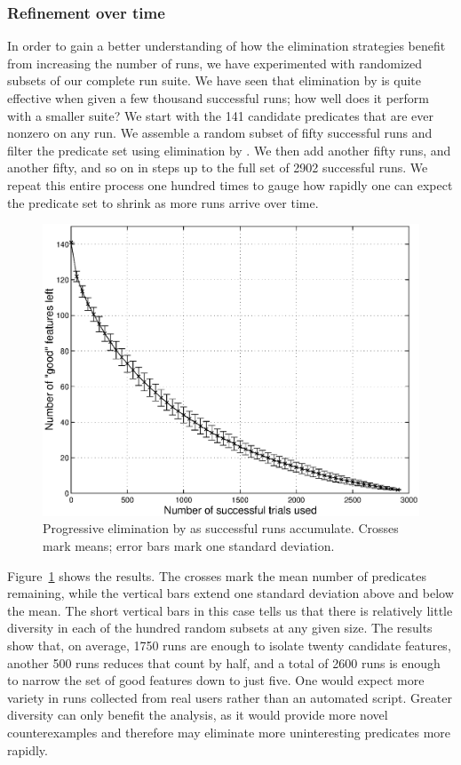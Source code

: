 \subsubsection{Refinement over time}

In order to gain a better understanding of how the elimination
strategies benefit from increasing the number of runs, we have
experimented with randomized subsets of our complete run suite.  We
have seen that elimination by  is
quite effective when given a few thousand successful runs; how well
does it perform with a smaller suite?  We start with the 141 candidate
predicates that are ever nonzero on any run.  We assemble a random
subset of fifty successful runs and filter the predicate set using
elimination by .  We then add another
fifty runs, and another fifty, and so on in steps up to the full set
of 2902 successful runs.  We repeat this entire process one hundred
times to gauge how rapidly one can expect the predicate set to shrink
as more runs arrive over time.

\begin{figure}
  \centering
  \small
  \includegraphics[width=\columnwidth]{applications/ds1000ngood_plot}
  \caption{Progressive elimination by 
    as successful runs accumulate.  Crosses mark means; error bars
    mark one standard deviation.}
  \label{fig:ngood}
\end{figure}

Figure~\ref{fig:ngood} shows the results.  The crosses mark the mean
number of predicates remaining, while the vertical bars extend one
standard deviation above and below the mean.  The short vertical bars
in this case tells us that there is relatively little diversity in
each of the hundred random subsets at any given size.  The results
show that, on average, 1750 runs are enough to isolate twenty
candidate features, another 500 runs reduces that count by half, and a
total of 2600 runs is enough to narrow the set of good features down
to just five.  One would expect more variety in runs collected from
real users rather than an automated script.  Greater diversity can
only benefit the analysis, as it would provide more novel
counterexamples and therefore may eliminate more uninteresting
predicates more rapidly.

